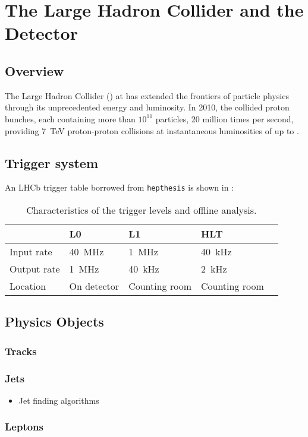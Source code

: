 \chapter{The Large Hadron Collider and the \ATLAS Detector}
\label{chap:detector}

\section{Overview}
The Large Hadron Collider (\LHC) at \CERN has extended the frontiers of particle physics through its unprecedented energy and luminosity.
In 2010, the \LHC collided proton bunches, each containing more than $10^{11}$ particles, 20 million times per second, providing \SI{7}{\TeV} proton-proton collisions at instantaneous luminosities of up to \peakLumi.

\section{Trigger system}
\label{sec:bg-theory:triggers}
An LHCb trigger table borrowed from \texttt{hepthesis} is shown in :

\begin{table}[bht]
  \begin{tabular}{lllll}
                & L0              & L1              & HLT             \\
    \midrule
    Input rate  & \SI{40}{\MHz} & \SI{1}{\MHz}  & \SI{40}{\kHz} \\
    Output rate & \SI{1}{\MHz}  & \SI{40}{\kHz} & \SI{2}{\kHz}  \\
    Location    & On detector     & Counting room   & Counting room   \\
  \end{tabular}
  \caption{Characteristics of the trigger levels and offline analysis.}
  \label{tab:bg-theory:trigger_details}
\end{table}

\section{Physics Objects}\label{sec:physics-objects}
\subsection{Tracks}\label{sec:tracks}

\subsection{Jets}\label{sec:jets}

\begin{itemize}
  \item Jet finding algorithms
\end{itemize}

\subsection{Leptons}\label{sec:leptons}